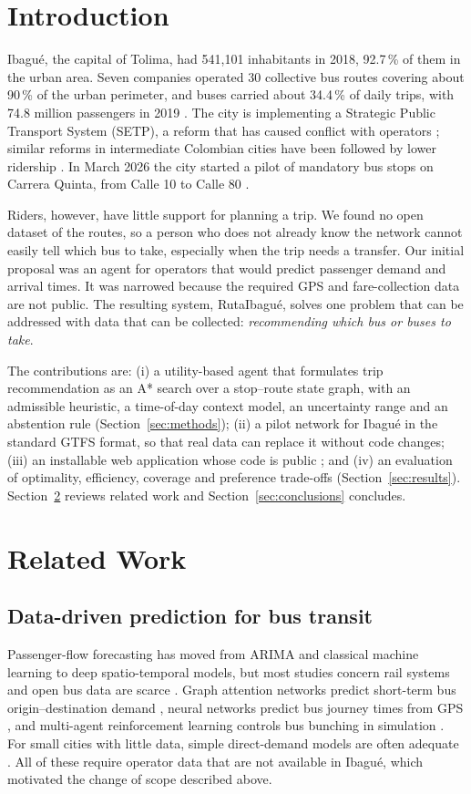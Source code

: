 \documentclass[10pt,twocolumn,letterpaper]{article}
\begin{document}
\section{Introduction}
Ibagué, the capital of Tolima, had 541,101 inhabitants in 2018, 92.7\,\% of them in the urban area. Seven companies operated 30 collective bus routes covering about 90\,\% of the urban perimeter, and buses carried about 34.4\,\% of daily trips, with 74.8 million passengers in 2019 \cite{conpes4017}. The city is implementing a Strategic Public Transport System (SETP), a reform that has caused conflict with operators \cite{bluradio2023}; similar reforms in intermediate Colombian cities have been followed by lower ridership \cite{gomezlobo2020}. In March 2026 the city started a pilot of mandatory bus stops on Carrera Quinta, from Calle 10 to Calle 80 \cite{rcn2026}.

Riders, however, have little support for planning a trip. We found no open dataset of the routes, so a person who does not already know the network cannot easily tell which bus to take, especially when the trip needs a transfer. Our initial proposal was an agent for operators that would predict passenger demand and arrival times. It was narrowed because the required GPS and fare-collection data are not public. The resulting system, RutaIbagué, solves one problem that can be addressed with data that can be collected: \emph{recommending which bus or buses to take}.

The contributions are: (i) a utility-based agent that formulates trip recommendation as an A* search over a stop--route state graph, with an admissible heuristic, a time-of-day context model, an uncertainty range and an abstention rule (Section~\ref{sec:methods}); (ii) a pilot network for Ibagué in the standard GTFS format, so that real data can replace it without code changes; (iii) an installable web application whose code is public \cite{repo}; and (iv) an evaluation of optimality, efficiency, coverage and preference trade-offs (Section~\ref{sec:results}). Section~\ref{sec:related} reviews related work and Section~\ref{sec:conclusions} concludes.

\section{Related Work}\label{sec:related}
\subsection{Data-driven prediction for bus transit}
Passenger-flow forecasting has moved from ARIMA and classical machine learning to deep spatio-temporal models, but most studies concern rail systems and open bus data are scarce \cite{hecht2025}. Graph attention networks predict short-term bus origin--destination demand \cite{cao2025}, neural networks predict bus journey times from GPS \cite{lim2024}, and multi-agent reinforcement learning controls bus bunching in simulation \cite{wang2020}. For small cities with little data, simple direct-demand models are often adequate \cite{shellhamer2019}. All of these require operator data that are not available in Ibagué, which motivated the change of scope described above.
\end{document}
